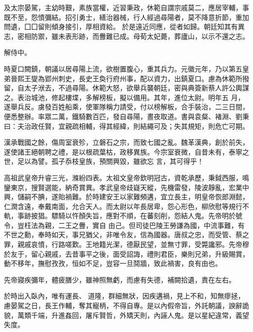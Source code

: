 \begin{pinyinscope}
 及太宗晏駕，主幼時艱，素族當權，近習秉政，休範自謂宗戚莫二，應居宰輔，事既不至，怨憤彌結。招引勇士，繕治器械，行人經過尋陽者，莫不降意折節，重加問遺，囗囗留則傾身接引，厚相資給。
 於是遠近同應，從者如歸。朝廷知其有異志，密相防禦，雖未表形跡，而釁難已成。母荀太妃薨，葬廬山，以示不還之志。



 解侍中。



 時夏口闕鎮，朝議以居尋陽上流，欲樹置腹心，重其兵力。元徽元年，乃以第五皇弟晉熙王燮為郢州刺史，長史王奐行府州事，配以資力，出鎮夏口。慮為休範所撥留，自太子洑去，不過尋陽。休範大怒，欲舉兵襲朝廷，密與典簽新蔡人許公輿謀之。表治城池，修起樓堞，多解榜板，擬以備用。其年，進位太尉。明年五
 月，遂舉兵反。虜發百姓船乘，使軍隊稱力請受，付以榜解板，合手裝治，二三日間，便悉整辦。率眾二萬，鐵騎數百匹，發自尋陽，晝夜取道。書與袁粲、褚淵、劉秉曰：夫治政任賢，宜親疏相輔，得其經緯，則結繩可及；失其規矩，則危亡可期。



 漢承戰國之餘，傷周室衰殄，立磐石之宗，而致七國之亂。魏革漢典，創於前失，遂使諸王絕朝聘之禮，是以根疏葉枯，政移異族。今宗室衰微，自昔未有，泰寧之世，足以為譬。孤子忝枝皇族，預關興毀，雖欲忘
 言，其可得乎！



 高祖武皇帝升睿三光，滌紛四表。太祖文皇帝欽明冠古，資乾承歷，秉鉞西服，鳴鑾東京，搜賢選能，納奇賞異。孝武皇帝歧嶷天縱，先機雷發，陵波靜亂，宏業中興，儲嗣不腆，遂貽禍難。於時建安王以家難頻遘，宜立長主，明皇帝恢郎淵懿，仁潤含遠，奉戴南面，允合天人。而太尉以年長居卑，怨心形色，柳欣慰等規行不軌，事跡披猖。驃騎以忤顏失旨，應對不順，在蕃刻削，怨結人鬼。先帝明於號令，豈枉法為親，二王之釁，實自
 由己。但司徒巴陵王勞謙為國，中流事難，有不世之勳，奉時如天，事兄猶父，非唯令友，信為國器。唐叔之忠，而受管、蔡之罪，親戚哀憤，行路嗟歎。王地籍光潔，德厭民望，並無寸罪，受斃讒邪。先帝穆於友于，留心親戚，去昔事平之後，面受詔誨，禮則君臣，樂則兄弟，升級賜賞，動不移年，撫慰孜孜，恒如不足，豈容一旦鬩牆，致此禍害，良有由也。



 先帝寢疾彌年，體疲膳少，雖神照無虧，而慮有失德，補闕拾遺，責在左右。



 於時出入臥內，唯有運長、
 道隆，群細無狀，因疾遘禍，見上不和，知無瘳拯，慮晏駕之日，長王作輔，奪其寵柄，不得自專。是以內假帝旨，外託朝議，諛辭詭貌，萬類千端，升進姦回，屠斥賢哲，外矯天則，內誣人鬼。是以星紀違常，義望失度。




\end{pinyinscope}
